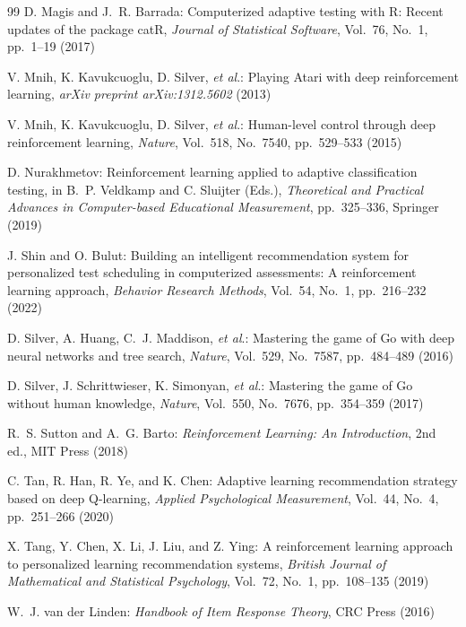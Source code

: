 \documentclass[dvipdfmx,a4j]{jarticle}
\begin{document}
\begin{thebibliography}{99}
D. Magis and J.~R. Barrada:
Computerized adaptive testing with R: Recent updates of the package catR,
\textit{Journal of Statistical Software}, Vol.~76, No.~1, pp.~1--19 (2017)

V. Mnih, K. Kavukcuoglu, D. Silver, \textit{et al}.:
Playing Atari with deep reinforcement learning,
\textit{arXiv preprint arXiv:1312.5602} (2013)

V. Mnih, K. Kavukcuoglu, D. Silver, \textit{et al}.:
Human-level control through deep reinforcement learning,
\textit{Nature}, Vol.~518, No.~7540, pp.~529--533 (2015)

D. Nurakhmetov:
Reinforcement learning applied to adaptive classification testing,
in B.~P. Veldkamp and C. Sluijter (Eds.),
\textit{Theoretical and Practical Advances in Computer-based Educational Measurement},
pp.~325--336, Springer (2019)

J. Shin and O. Bulut:
Building an intelligent recommendation system for personalized test scheduling in computerized assessments: A reinforcement learning approach,
\textit{Behavior Research Methods}, Vol.~54, No.~1, pp.~216--232 (2022)

D. Silver, A. Huang, C.~J. Maddison, \textit{et al}.:
Mastering the game of Go with deep neural networks and tree search,
\textit{Nature}, Vol.~529, No.~7587, pp.~484--489 (2016)

D. Silver, J. Schrittwieser, K. Simonyan, \textit{et al}.:
Mastering the game of Go without human knowledge,
\textit{Nature}, Vol.~550, No.~7676, pp.~354--359 (2017)

R.~S. Sutton and A.~G. Barto:
\textit{Reinforcement Learning: An Introduction},
2nd ed., MIT Press (2018)

C. Tan, R. Han, R. Ye, and K. Chen:
Adaptive learning recommendation strategy based on deep Q-learning,
\textit{Applied Psychological Measurement}, Vol.~44, No.~4, pp.~251--266 (2020)

X. Tang, Y. Chen, X. Li, J. Liu, and Z. Ying:
A reinforcement learning approach to personalized learning recommendation systems,
\textit{British Journal of Mathematical and Statistical Psychology},
Vol.~72, No.~1, pp.~108--135 (2019)

W.~J. van der Linden:
\textit{Handbook of Item Response Theory},
CRC Press (2016)


\end{thebibliography}
\end{document}
